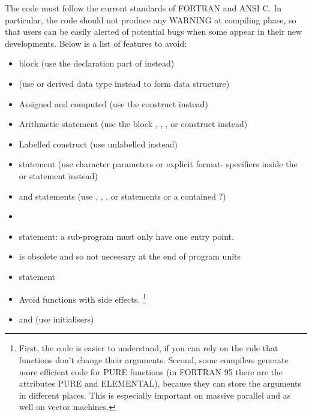 The code must follow the current standards of FORTRAN and ANSI C.
In particular, the code should not produce any WARNING at compiling phase, so that
users can be easily alerted of potential bugs when some appear in their new developments.
Below is a list of features to avoid:
\begin{itemize}
\item {} block
  (use the declaration part of  instead)
\item {}
  (use  or derived data type instead to form data structure)
\item Assigned and computed 
  (use the  construct instead)
\item Arithmetic  statement
  (use the block , , ,  or
   construct instead)
\item Labelled  construct
  (use unlabelled  instead)
\item {} statement
  (use character parameters or
  explicit format- specifiers inside the  or  statement instead)
\item {} and  statements
  (use , , ,  or  statements or
  a contained ?)
\item {}
\item {} statement: a sub-program must only have one entry point.
\item {} is obsolete and so not necessary at the end of program units
\item {} statement
\item Avoid functions with side effects.
  \footnote{
    First, the code is easier to understand, if you can rely on
    the rule that functions don't change their arguments.
    Second, some compilers generate more efficient code for PURE functions
    (in FORTRAN 95 there are the attributes PURE and ELEMENTAL), because
    they can store the arguments in different places.
    This is especially important on massive parallel and as well on vector machines.
  }
\item {} and 
  (use initialisers)
\end{itemize}


